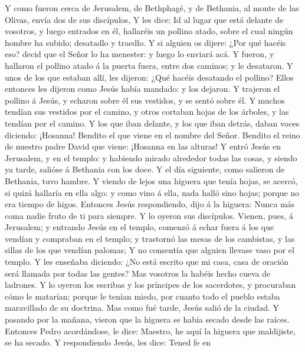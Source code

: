  Y como fueron cerca de Jerusalem, de Bethphagé, y de
Bethania, al monte de las Olivas, envía dos de sus discípulos,
 Y les dice: Id al lugar que está delante de vosotros, y
luego entrados en él, hallaréis un pollino atado, sobre el cual ningún
hombre ha subido; desatadlo y traedlo.  Y si alguien os
dijere: ¿Por qué hacéis eso? decid que el Señor lo ha menester: y luego
lo enviará acá.  Y fueron, y hallaron el pollino atado á la
puerta fuera, entre dos caminos; y le desataron.  Y unos de
los que estaban allí, les dijeron: ¿Qué hacéis desatando el pollino?
 Ellos entonces les dijeron como Jesús había mandado: y los
dejaron.  Y trajeron el pollino á Jesús, y echaron sobre él
sus vestidos, y se sentó sobre él.  Y muchos tendían sus
vestidos por el camino, y otros cortaban hojas de los árboles, y las
tendían por el camino.  Y los que iban delante, y los que
iban detrás, daban voces diciendo: ¡Hosanna! Bendito el que viene en el
nombre del Señor.  Bendito el reino de nuestro padre David
que viene: ¡Hosanna en las alturas!  Y entró Jesús en
Jerusalem, y en el templo: y habiendo mirado alrededor todas las cosas,
y siendo ya tarde, salióse á Bethania con los doce.  Y el
día siguiente, como salieron de Bethania, tuvo hambre.  Y
viendo de lejos una higuera que tenía hojas, se acercó, si quizá
hallaría en ella algo: y como vino á ella, nada halló sino hojas; porque
no era tiempo de higos.  Entonces Jesús respondiendo, dijo
á la higuera: Nunca más coma nadie fruto de ti para siempre. Y lo oyeron
sus discípulos.  Vienen, pues, á Jerusalem; y entrando
Jesús en el templo, comenzó á echar fuera á los que vendían y compraban
en el templo; y trastornó las mesas de los cambistas, y las sillas de
los que vendían palomas;  Y no consentía que alguien
llevase vaso por el templo.  Y les enseñaba diciendo: ¿No
está escrito que mi casa, casa de oración será llamada por todas las
gentes? Mas vosotros la habéis hecho cueva de ladrones.  Y
lo oyeron los escribas y los príncipes de los sacerdotes, y procuraban
cómo le matarían; porque le tenían miedo, por cuanto todo el pueblo
estaba maravillado de su doctrina.  Mas como fué tarde,
Jesús salió de la ciudad.  Y pasando por la mañana, vieron
que la higuera se había secado desde las raíces.  Entonces
Pedro acordándose, le dice: Maestro, he aquí la higuera que maldijiste,
se ha secado.  Y respondiendo Jesús, les dice: Tened fe en
